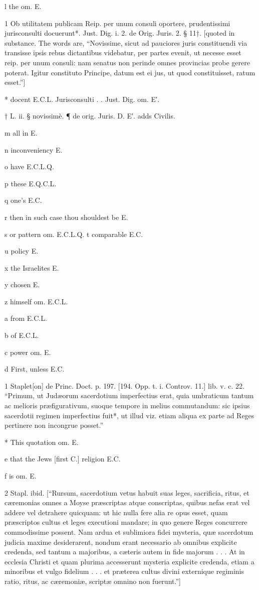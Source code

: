l
the om. E.

1
Ob utilitatem publicam Reip. per unum consuli oportere, prudentissimi jurisconsulti docuerunt*. Just. Dig. i. 2. de Orig. Juris. 2. § 11†. [quoted in substance. The words are, “Novissime, sicut ad pauciores juris constituendi via transisse ipsis rebus dictantibus videbatur, per partes evenit, ut necesse esset reip. per unum consuli: nam senatus non perinde omnes provincias probe gerere poterat. Igitur constituto Principe, datum est ei jus, ut quod constituisset, ratum esset.”]

*
docent E.C.L. Jurisconsulti . . Just. Dig. om. E′.

†
L. ii. § novissimè. ¶ de orig. Juris. D. E′. adds Civilis.

m
all in E.

n
inconveniency E.

o
have E.C.L.Q.

p
these E.Q.C.L.

q
one’s E.C.

r
then in such case thou shouldest be E.

s or pattern om. E.C.L.Q.
t
comparable E.C.

u
policy E.

x
the Israelites E.

y
chosen E.

z
himself om. E.C.L.

a
from E.C.L.

b
of E.C.L.

c
power om. E.

d
First, unless E.C.

1
Staplet[on] de Princ. Doct. p. 197. [194. Opp. t. i. Controv. 11.] lib. v. c. 22. “Primum, ut Judæorum sacerdotium imperfectius erat, quia umbraticum tantum ac melioris præfigurativum, suoque tempore in melius commutandum: sic ipsius sacerdotii regimen imperfectius fuit*, ut illud viz. etiam aliqua ex parte ad Reges pertinere non incongrue posset.”

*
This quotation om. E.

e
that the Jews [first C.] religion E.C.

f
is om. E.

2
Stapl. ibid. [“Rursum, sacerdotium vetus habuit suas leges, sacrificia, ritus, et cæremonias omnes a Moyse præscriptas atque conscriptas, quibus nefas erat vel addere vel detrahere quicquam: ut hic nulla fere alia re opus esset, quam præscriptos cultus et leges executioni mandare; in quo genere Reges concurrere commodissime possent. Nam ardua et sublimiora fidei mysteria, quæ sacerdotum judicia maxime desiderarent, nondum erant necessario ab omnibus explicite credenda, sed tantum a majoribus, a cæteris autem in fide majorum . . . At in ecclesia Christi et quam plurima accesserunt mysteria explicite credenda, etiam a minoribus et vulgo fidelium . . . et præterea cultus divini externique regiminis ratio, ritus, ac cæremoniæ, scriptæ omnino non fuerunt.”]

